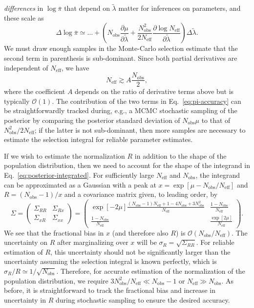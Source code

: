 \documentclass[modern]{aastex62}
\newcommand{\Neff}{N_\mathrm{eff}}
\newcommand{\Nobs}{N_\mathrm{obs}}
\begin{document}
\emph{differences} in $\log \bar{\pi}$ that depend on $\tilde{\lambda}$ matter
for inferences on parameters, and these scale as
%
\begin{equation}
  \label{eq:pi-accuracy}
    \Delta \log \bar{\pi} \simeq \ldots + \left( \Nobs \frac{\partial \mu}{\partial \tilde{\lambda}} + \frac{\Nobs^2}{2\Neff} \frac{\partial \log \Neff}{\partial \tilde{\lambda}} \right) \Delta \tilde{\lambda}.
\end{equation}
%
We must draw enough samples in the Monte-Carlo selection estimate that the
second term in parenthesis is sub-dominant.  Since both partial derivatives are
independent of $\Neff$, we have
%
\begin{equation}
    \Neff \gtrsim A \frac{\Nobs}{2},
\end{equation}
%
where the coefficient $A$ depends on the ratio of derivative terms above but is
typically $\mathcal{O}(1)$.  The contribution of the two terms in Eq.\
\eqref{eq:pi-accuracy} can be straightforwardly tracked during, e.g., a MCMC
stochastic sampling of the posterior by comparing the posterior standard
deviation of $\Nobs \mu$ to that of $\Nobs^2/2\Neff$; if the latter is not
sub-dominant, then more samples are necessary to estimate the selection integral
for reliable parameter estimates.

If we wish to estimate the normalization $R$ in addition to the shape of the
population distribution, then we need to account for the shape of the integrand
in Eq.\ \eqref{eq:posterior-integrated}.  For sufficiently large $\Neff$ and
$\Nobs$, the integrand can be approximated as a Gaussian with a peak at $x =
\exp\left[ \mu - \Nobs/\Neff \right]$ and $R = \left( \Nobs - 1 \right)/x$ and a
covariance matrix given, to leading order, by
%
\begin{equation}
  \Sigma = \begin{pmatrix} \Sigma_{RR} & \Sigma_{Rx} \\ \Sigma_{xR} & \Sigma_{xx} \end{pmatrix} = \begin{pmatrix} \exp\left[ - 2 \mu \right] \frac{\left(\Nobs - 1 \right)\Neff + 1 - 4 \Nobs + 3 \Nobs^2}{\Neff} & \frac{1 - \Nobs}{\Neff} \\ \frac{1-\Nobs}{\Neff} & \frac{\exp\left[ 2 \mu \right]}{\Neff} \end{pmatrix}.
\end{equation}
%
We see that the fractional bias in $x$ (and therefore also $R$) is
$\mathcal{O}\left( \Nobs / \Neff \right)$.  The uncertainty on $R$ after
marginalizing over $x$ will be $\sigma_R = \sqrt{\Sigma_{RR}}$.  For reliable
estimation of $R$, this uncertainty should not be significantly larger than the
uncertainty assuming the selection integral is known perfectly, which is
$\sigma_R / R \simeq 1/\sqrt{\Nobs}$.  Therefore, for accurate estimation of the
normalization of the population distribution, we require $3\Nobs^2/\Neff \ll
\Nobs - 1$ or $\Neff \gg \Nobs$.  As before, it is straightforward to track the
fractional bias and increase in uncertainty in $R$ during stochastic sampling to
ensure the desired accuracy.


\end{document}
